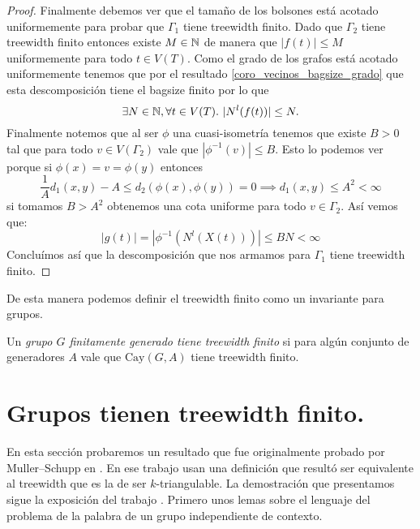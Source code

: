 \documentclass[tesis.tex]{subfiles}
\begin{document}
\begin{proof}
	Finalmente debemos ver que el tamaño de los bolsones está acotado uniformemente para probar que $\Gamma_{1}$ tiene treewidth finito.
	Dado que $\Gamma_2$ tiene treewidth finito entonces existe $M \in \mathbb{N}$ de manera que  $|f(t)| \le M$ uniformemente para todo $t \in V(T)$. 
	Como el grado de los grafos está acotado uniformemente tenemos que por el resultado \ref{coro_vecinos_bagsize_grado} que esta descomposición tiene el bagsize finito por lo que
	\[
	\exists N \in \mathbb{N}, \forall t \in V(T). \  |N^l(f(t))| \le N.
	\]
	Finalmente notemos que al ser $\phi$ una cuasi-isometría tenemos que existe $B > 0$ tal que para todo $v \in V(\Gamma_2)$ vale que $|\phi^{-1}(v)| \le B$.
	Esto lo podemos ver porque si $\phi(x) = v = \phi(y)$ entonces
	\[
	\frac{1}{A}d_{1}(x,y) - A \le d_{2}(\phi(x), \phi(y) ) = 0 \implies d_{1}(x,y) \le A^2 < \infty
	\]
	si tomamos $B > A^2$ obtenemos una cota uniforme para todo $v \in \Gamma_2$. 
	Así vemos que:
	\[
	|g(t)| = |\phi^{-1}(N^l(X(t)))| \le BN < \infty
	\]
	Concluímos así que la descomposición que nos armamos para $\Gamma_1$ tiene treewidth finito.
\end{proof}

De esta manera podemos definir el treewidth finito como un invariante para grupos.

\begin{deff}
	Un \emph{grupo $G$ finitamente generado tiene treewidth finito} si para algún conjunto de generadores $A$ vale que $\text{Cay}(G,A)$ tiene treewidth finito.
\end{deff}


\section{Grupos \ic tienen treewidth finito.}\label{secc_MuSch}

En esta sección probaremos un resultado que fue originalmente probado por Muller--Schupp en \cite{muller1985theory}.
En ese trabajo usan una definición que resultó ser equivalente al treewidth que es la de ser $k$-triangulable.
La demostración que presentamos sigue la exposición del trabajo \cite{diekert2017context}.
Primero unos lemas sobre el lenguaje del problema de la palabra de un grupo independiente de contexto.
\end{document}

